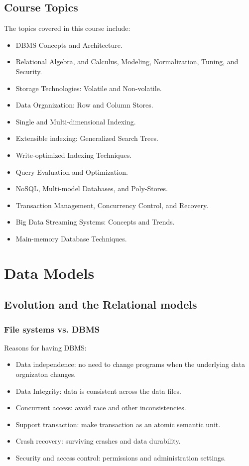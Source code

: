 \documentclass{ainote}
\begin{document}
\subsection{Course Topics}
The topics covered in this course include:
\begin{itemize}
    \item DBMS Concepts and Architecture.
    \item {} Relational Algebra, and Calculus, Modeling, Normalization, Tuning, and Security.
    \item Storage Technologies: Volatile and Non-volatile.
    \item Data Organization: Row and Column Stores.
    \item Single and Multi-dimensional Indexing.
    \item Extensible indexing: Generalized Search Trees.
    \item Write-optimized Indexing Techniques.
    \item Query Evaluation and Optimization.
    \item NoSQL, Multi-model Databases, and Poly-Stores.
    \item Transaction Management, Concurrency Control, and Recovery.
    \item Big Data Streaming Systems: Concepts and Trends.
    \item Main-memory Database Techniques.
\end{itemize}

\section{Data Models}
\subsection{Evolution and the Relational models}
\subsubsection{File systems vs. DBMS}
Reasons for having DBMS:
\begin{itemize}
    \item Data independence: no need to change programs when the underlying data orgnizaton changes.
    \item Data Integrity: data is consistent across the data files.
    \item Concurrent access: avoid race and other inconsistencies.
    \item Support transaction: make transaction as an atomic semantic unit.
    \item Crash recovery: surviving crashes and data durability.
    \item Security and access control: permissions and administration settings.
\end{itemize}
\end{document}

